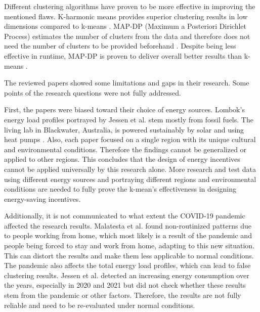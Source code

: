 Different clustering algorithms have proven to be more effective in improving the mentioned flaws.
K-harmonic means provides superior clustering results in low dimensions compared to k-means \cite{HAM-ALT}.
MAP-DP (Maximum a Posteriori Dirichlet Process) estimates the number of clusters from the data and therefore does not need the number of clusters to be provided beforehand \cite{RAY-ALT}.
Despite being less effective in runtime, MAP-DP is proven to deliver overall better results than k-means \cite{RAY-ALT}.

The reviewed papers showed some limitations and gaps in their research.
Some points of the research questions were not fully addressed.

First, the papers were biased toward their choice of energy sources.
Lombok's energy load profiles portrayed by Jessen et al. \cite{JES-IND} stem mostly from fossil fuels.
The living lab in Blackwater, Australia, is powered sustainably by solar and using heat pumps \cite{MAL-HBP}.
Also, each paper focused on a single region with its unique cultural and environmental conditions.
Therefore the findings cannot be generalized or applied to other regions.
This concludes that the design of energy incentives cannot be applied universally by this research alone.
More research and test data using different energy sources and portraying different regions and environmental conditions are needed to fully prove the k-mean's effectiveness in designing energy-saving incentives. 

Additionally, it is not communicated to what extent the COVID-19 pandemic affected the research results.
Malatesta et al. \cite{MAL-HBP} found non-routinized patterns due to people working from home, which most likely is a result of the pandemic and people being forced to stay and work from home, adapting to this new situation.
This can distort the results and make them less applicable to normal conditions.
The pandemic also affects the total energy load profiles, which can lead to false clustering results.
Jessen et al. \cite{JES-IND} detected an increasing energy consumption over the years, especially in 2020 and 2021 but did not check whether these results stem from the pandemic or other factors.
Therefore, the results are not fully reliable and need to be re-evaluated under normal conditions.

